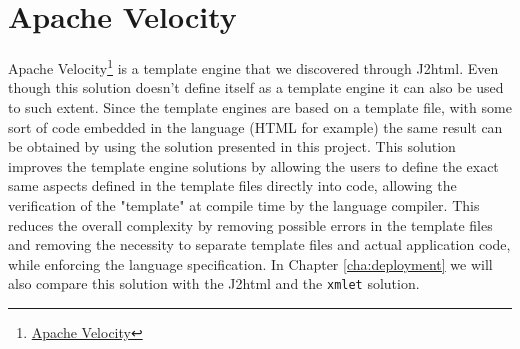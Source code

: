 \section{Apache Velocity} %
\label{sec:apachevelocity}

Apache Velocity\footnote{\href{http://velocity.apache.org/}{Apache Velocity}} is a template engine that we discovered through J2html. Even though this solution doesn't define itself as a template engine it can also be used to such extent. Since the template engines are based on a template file, with some sort of code embedded in the language (\ac{HTML} for example) the same result can be obtained by using the solution presented in this project. This solution improves the template engine solutions by allowing the users to define the exact same aspects defined in the template files directly into code, allowing the verification of the "template" at compile time by the language compiler. This reduces the overall complexity by removing possible errors in the template files and removing the necessity to separate template files and actual application code, while enforcing the language specification. In Chapter \ref{cha:deployment} we will also compare this solution with the J2html and the \texttt{xmlet} solution.
